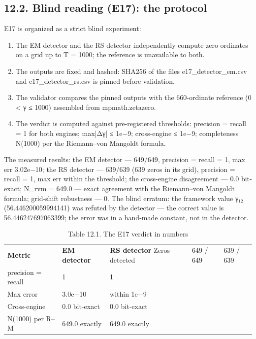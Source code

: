 \documentclass[11pt,a4paper]{article}
\begin{document}
\subsection{12.2. Blind reading (E17): the protocol}

E17 is organized as a strict blind experiment:

\begin{enumerate}
  \item The EM detector and the RS detector independently compute zero ordinates on a grid up to T = 1000; the reference is unavailable to both.
  \item The outputs are fixed and hashed: SHA256 of the files e17\_detector\_em.csv and e17\_detector\_rs.csv is pinned before validation.
  \item The validator compares the pinned outputs with the 660-ordinate reference (0 < γ ≤ 1000) assembled from mpmath.zetazero.
  \item The verdict is computed against pre-registered thresholds: precision = recall = 1 for both engines; max|Δγ| ≤ 1e−9; cross-engine ≤ 1e−9; completeness N(1000) per the Riemann–von Mangoldt formula.
\end{enumerate}

The measured results: the EM detector — 649/649, precision = recall = 1, max err 3.02e−10; the RS detector — 639/639 (639 zeros in its grid), precision = recall = 1, max err within the threshold; the cross-engine disagreement — 0.0 bit-exact; N\_rvm = 649.0 — exact agreement with the Riemann–von Mangoldt formula; grid-shift robustness — 0. The blind erratum: the framework value γ₁₂ (56.446200059994141) was refuted by the detector — the correct value is 56.446247697063399; the error was in a hand-made constant, not in the detector.

\begin{table}[htbp]\centering\small
\caption{Table 12.1. The E17 verdict in numbers}
\begin{tabular}{p{} p{} p{}}
\toprule
\textbf{Metric} & \textbf{EM detector} & \textbf{RS detector}
\midrule
Zeros detected & 649 / 649 & 639 / 639 \\
precision = recall & 1 & 1 \\
Max error & 3.0e−10 & within 1e−9 \\
Cross-engine & 0.0 bit-exact & 0.0 bit-exact \\
N(1000) per R–M & 649.0 exactly & 649.0 exactly \\
\bottomrule
\end{tabular}
\end{table}
\end{document}
